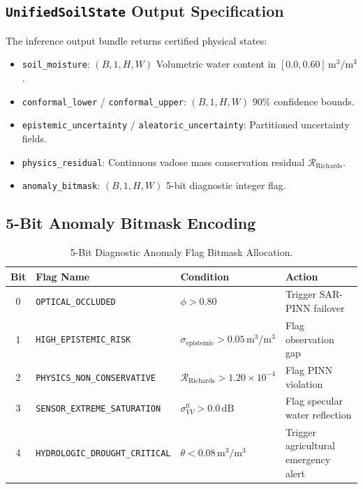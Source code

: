 \documentclass[11pt,a4paper]{article}
\theoremstyle{definition}
\theoremstyle{remark}
\begin{document}
\subsection{\texttt{UnifiedSoilState} Output Specification}
The inference output bundle returns certified physical states:
\begin{itemize}
    \item \texttt{soil\_moisture}: $(B, 1, H, W)$ Volumetric water content in $[0.0, 0.60]\,\text{m}^3/\text{m}^3$.
    \item \texttt{conformal\_lower} / \texttt{conformal\_upper}: $(B, 1, H, W)$ $90\%$ confidence bounds.
    \item \texttt{epistemic\_uncertainty} / \texttt{aleatoric\_uncertainty}: Partitioned uncertainty fields.
    \item \texttt{physics\_residual}: Continuous vadose mass conservation residual $\mathcal{R}_{\text{Richards}}$.
    \item \texttt{anomaly\_bitmask}: $(B, 1, H, W)$ 5-bit diagnostic integer flag.
\end{itemize}

\subsection{5-Bit Anomaly Bitmask Encoding}
\begin{table}[h!]
\centering
\small
\begin{tabular}{clll}
\toprule
\textbf{Bit} & \textbf{Flag Name} & \textbf{Condition} & \textbf{Action} \\
\midrule
0 & \texttt{OPTICAL\_OCCLUDED} & $\phi > 0.80$ & Trigger SAR-PINN failover \\
1 & \texttt{HIGH\_EPISTEMIC\_RISK} & $\sigma_{\text{epistemic}} > 0.05\,\text{m}^3/\text{m}^3$ & Flag observation gap \\
2 & \texttt{PHYSICS\_NON\_CONSERVATIVE} & $\mathcal{R}_{\text{Richards}} > 1.20 \times 10^{-4}$ & Flag PINN violation \\
3 & \texttt{SENSOR\_EXTREME\_SATURATION} & $\sigma^0_{VV} > 0.0\,\text{dB}$ & Flag specular water reflection \\
4 & \texttt{HYDROLOGIC\_DROUGHT\_CRITICAL} & $\theta < 0.08\,\text{m}^3/\text{m}^3$ & Trigger agricultural emergency alert \\
\bottomrule
\end{tabular}
\caption{5-Bit Diagnostic Anomaly Flag Bitmask Allocation.}
\label{tab:bitmask}
\end{table}
\end{document}
